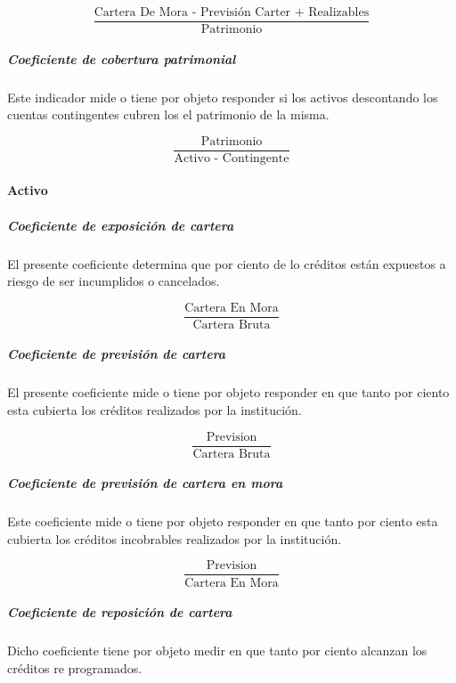 \documentclass[
  12pt,
]{article}
\begin{document}
\[ \frac{ \text{Cartera De Mora - Previsión Carter + Realizables} }{ \text{Patrimonio} } \]

\hypertarget{coeficiente-de-cobertura-patrimonial}{%
\subparagraph{Coeficiente de cobertura
patrimonial}\label{coeficiente-de-cobertura-patrimonial}}

Este indicador mide o tiene por objeto responder si los activos
descontando los cuentas contingentes cubren los el patrimonio de la
misma.

\[ \frac{ \text{Patrimonio} }{ \text{Activo - Contingente} } \]

\hypertarget{activo}{%
\paragraph{Activo}\label{activo}}

\hypertarget{coeficiente-de-exposiciuxf3n-de-cartera}{%
\subparagraph{Coeficiente de exposición de
cartera}\label{coeficiente-de-exposiciuxf3n-de-cartera}}

El presente coeficiente determina que por ciento de lo créditos están
expuestos a riesgo de ser incumplidos o cancelados.

\[  \frac{ \text{Cartera En Mora} }{ \text{Cartera Bruta} } \]

\hypertarget{coeficiente-de-previsiuxf3n-de-cartera}{%
\subparagraph{Coeficiente de previsión de
cartera}\label{coeficiente-de-previsiuxf3n-de-cartera}}

El presente coeficiente mide o tiene por objeto responder en que tanto
por ciento esta cubierta los créditos realizados por la institución.

\[ \frac{ \text{Prevision} }{ \text{Cartera Bruta} } \]

\hypertarget{coeficiente-de-previsiuxf3n-de-cartera-en-mora}{%
\subparagraph{Coeficiente de previsión de cartera en
mora}\label{coeficiente-de-previsiuxf3n-de-cartera-en-mora}}

Este coeficiente mide o tiene por objeto responder en que tanto por
ciento esta cubierta los créditos incobrables realizados por la
institución.

\[ \frac{ \text{Prevision} }{ \text{Cartera En Mora} } \]

\hypertarget{coeficiente-de-reposiciuxf3n-de-cartera}{%
\subparagraph{Coeficiente de reposición de
cartera}\label{coeficiente-de-reposiciuxf3n-de-cartera}}

Dicho coeficiente tiene por objeto medir en que tanto por ciento
alcanzan los créditos re programados.
\end{document}
